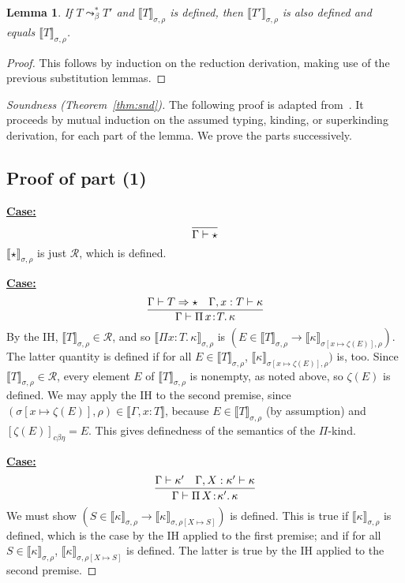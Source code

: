 \documentclass{article}
\newcommand{\choice}[0]{\zeta}
\newcommand{\abs}[4]{{#1}\, #2\! : \! #3.\, #4}
\newcommand{\interp}[1]{\llbracket #1 \rrbracket}
\newcommand{\tpsynth}[0]{\Rightarrow}
\newcommand{\cbe}[0]{c\beta\eta}
\newcommand{\startcase}[1]{\vspace{#1} \noindent\textbf{\underline{Case:}}}
\newtheorem{lemma}[theorem]{Lemma}
\begin{document}
\begin{lemma}
  \label{lem:interppres}
  If $T \leadsto^*_{\beta} T'$ and $\interp{T}_{\sigma,\rho}$ is defined, then $\interp{T'}_{\sigma,\rho}$ is also defined and equals $\interp{T}_{\sigma,\rho}$.
\end{lemma}
\begin{proof}
  This follows by induction on the reduction derivation, making use of the previous substitution lemmas.
\end{proof}

\begin{proof}[Soundness (Theorem~\ref{thm:snd})]
  The following proof is adapted from~\cite{stump17}.  It proceeds by
  mutual induction on the assumed typing, kinding, or superkinding
  derivation, for each part of the lemma.  We prove the parts
  successively.  

\subsection{Proof of part (1)}

\startcase{.2cm}
\[
\infer{\Gamma \vdash \star }{\ }
\]
$\interp{\star}_{\sigma,\rho}$ is just $\mathcal{R}$, which is
defined.  

\startcase{.2cm}
\[
    \infer{\Gamma\vdash\abs{\Pi}{x}{T}{\kappa}}{\Gamma \vdash T \tpsynth \star & \Gamma,x:T\vdash\kappa} 
\]
By the IH, $\interp{T}_{\sigma,\rho}\in\mathcal{R}$, and so
$\interp{\Pi x : T.\, \kappa}_{\sigma,\rho}$ is
$(E\in\interp{T}_{\sigma,\rho} \to \interp{\kappa}_{\sigma[x\mapsto  \choice(E)],\rho})$.
The latter quantity is defined if for all
$E\in\interp{T}_{\sigma,\rho}$, $\interp{\kappa}_{\sigma[x\mapsto \choice(E)],\rho})$ is, too.  Since
$\interp{T}_{\sigma,\rho}\in\mathcal{R}$, every element $E$ of
$\interp{T}_{\sigma,\rho}$ is nonempty, as noted above, 
so $\choice(E)$ is defined.  We may apply the IH to the second
premise, since
$(\sigma[x\mapsto\choice(E)],\rho)\in\interp{\Gamma,x:T}$, because $E\in\interp{T}_{\sigma,\rho}$ (by assumption)
and $[\choice(E)]_{\cbe} = E$.  This gives definedness of the semantics
of the $\Pi$-kind.

\startcase{.2cm}
\[
   \infer{\Gamma\vdash\abs{\Pi}{X}{\kappa'}{\kappa}}{\Gamma \vdash \kappa' & \Gamma,X:\kappa'\vdash\kappa}
\]
We must show $(S\in\interp{\kappa}_{\sigma,\rho} \to \interp{\kappa}_{\sigma,\rho[X\mapsto S]})$ is defined.
This is true if $\interp{\kappa}_{\sigma,\rho}$ is defined, which is the case by
the IH applied to the first premise; and if for all
$S\in\interp{\kappa}_{\sigma,\rho}$,
$\interp{\kappa}_{\sigma,\rho[X\mapsto S]}$ is defined.  The latter is
true by the IH applied to the second premise.  


\end{proof}
\end{document}
